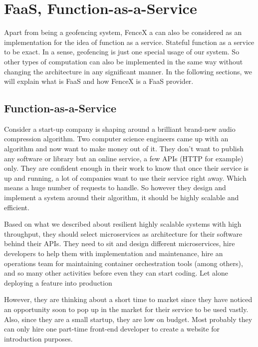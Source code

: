 \documentclass[a4]{report}
\begin{document}
    \chapter{FaaS, Function-as-a-Service}
    Apart from being a geofencing system, FenceX a can also be considered as an implementation for the idea of function as
    a service\cite{whatisfaas}.
    Stateful function as a service to be exact.
    In a sense, geofencing is just one special usage of our system.
    So other types of computation can also be implemented in the same way without changing the architecture in any significant manner.
    In the following sections, we will explain what is FaaS and how FenceX is a FaaS provider.


    \section{Function-as-a-Service}
    Consider a start-up company is shaping around a brilliant brand-new audio compression algorithm.
    Two computer science engineers came up with an algorithm and now want to make money out of it.
    They don't want to publish any software or library but an online service, a few APIs (HTTP for example) only.
    They are confident enough in their work to know that once their service is up and running, a lot of companies want to use their service right away.
    Which means a huge number of requests to handle.
    So however they design and implement a system around their algorithm, it should be highly scalable and efficient.

    Based on what we described about resilient highly scalable systems with high throughput, they should select
    microservices as architecture for their software behind their APIs.
    They need to sit and design different microservices, hire developers to help them with implementation and
    maintenance, hire an operations team for maintaining container orchestration tools (among others), and so many
    other activities before even they can start coding.
    Let alone deploying a feature into production

    However, they are thinking about a short time to market since they have noticed an opportunity soon to pop up in
    the market for their service to be used vastly.
    Also, since they are a small startup, they are low on budget.
    Most probably they can only hire one part-time front-end developer to create a website for introduction purposes.
\end{document}
